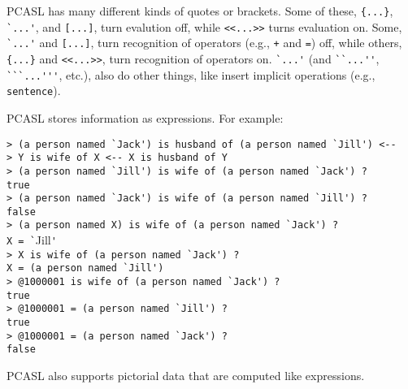 \documentclass[12pt]{article}
\newenvironment{indpar}[1][0.3in]%
	{\begin{list}{}%
		     {\setlength{\itemsep}{0in}%
		      \setlength{\topsep}{0in}%
		      \setlength{\parsep}{1ex}%
		      \setlength{\labelwidth}{#1}%
		      \setlength{\leftmargin}{#1}%
		      \addtolength{\leftmargin}{\labelsep}}%
	 \item}%
	{\end{list}}
\begin{document}
PCASL has many different kinds of quotes or brackets.  Some of these,
\verb|{...}|, \verb|`...'|, and \verb|[...]|, turn evalution off,
while \verb|<<...>>| turns evaluation on.  Some,
\verb|`...'| and \verb|[...]|, turn recognition of operators (e.g., \verb|+|
and \verb|=|) off, while others,
\verb|{...}| and \verb|<<...>>|, turn recognition of operators on.
\verb|`...'| (and \verb|``...''|, \verb|```...'''|, etc.), also do other
things, like insert implicit operations (e.g., \verb|sentence|).

PCASL stores information as expressions.  For example:

\begin{indpar}
\verb|> (a person named `Jack') is husband of (a person named `Jill') <--| \\
\verb|> Y is wife of X <-- X is husband of Y| \\
\verb|> (a person named `Jill') is wife of (a person named `Jack') ?| \\
\verb|true| \\
\verb|> (a person named `Jack') is wife of (a person named `Jill') ?| \\
\verb|false| \\
\verb|> (a person named X) is wife of (a person named `Jack') ?| \\
\verb|X = `|Jill\verb|'| \\
\verb|> X is wife of (a person named `Jack') ?| \\
\verb|X = (a person named `Jill')| \\
\verb|> @1000001 is wife of (a person named `Jack') ?| \\
\verb|true| \\
\verb|> @1000001 = (a person named `Jill') ?| \\
\verb|true| \\
\verb|> @1000001 = (a person named `Jack') ?| \\
\verb|false|
\end{indpar}

PCASL also supports pictorial data
that are computed like expressions.
\end{document}
